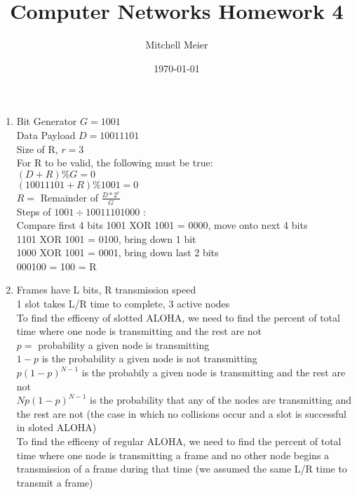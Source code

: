 \documentclass[14pt]{article}
\title{Computer Networks Homework 4}
\author{Mitchell Meier}
\date{\today}
\begin{document}
\maketitle

\begin{enumerate}

\item
Bit Generator $G = 1001$ \\
Data Payload $D = 10011101$ \\
Size of R, $r = 3$ \\

For R to be valid, the following must be true: \\

$(D + R) \% G = 0$ \\
$(10011101 + R) \% 1001 = 0$ \\
$R =$ Remainder of $\frac{D*2^r}{G}$ \\

Steps of $1001 \div 10011101000$ : \\
Compare first 4 bits 1001 XOR 1001 = 0000, move onto next 4 bits \\
1101 XOR 1001 = 0100, bring down 1 bit \\
1000 XOR 1001 = 0001, bring down last 2 bits \\
000100 = 100 = R


\item
Frames have L bits, R transmission speed \\
1 slot takes L/R time to complete, 3 active nodes \\

To find the efficeny of slotted ALOHA, we need to find the percent of total time where one node is transmitting and the rest are not \\

$p =$ probability a given node is transmitting \\
$1-p$ is the probability a given node is not transmitting \\
$p(1-p)^{N-1}$ is the probabily a given node is transmitting and the rest are not \\
$Np(1-p)^{N-1}$ is the probability that any of the nodes are transmitting and the rest are not (the case in which no collisions occur and a slot is successful in sloted ALOHA)\\

To find the efficeny of regular ALOHA, we need to find the percent of total time where one node is transmitting a frame and no other node begins a transmission of a frame during that time (we assumed the same L/R time to transmit a frame) \\


\end{enumerate}
\end{document}
